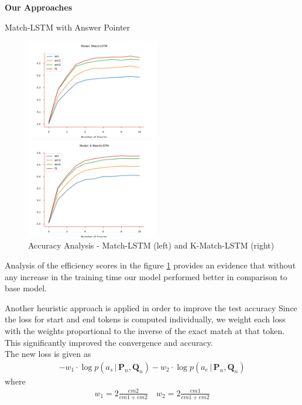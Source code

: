 \documentclass{article}
\def\*#1{\mathbf{#1}}
\begin{document}
\begin{psection}{\textbf{Our Approaches}}
\begin{psubsection}{Match-LSTM with Answer Pointer}
	\begin{figure}[ht!]
				\begin{minipage}{0.47\textwidth}
					\centering
					\includegraphics[trim={0 4mm 0 0},clip, width=220px]{includes/plots/match-lstm/accuracy-match-lstm.png}
					\caption*{(a) Match-LSTM}
				\end{minipage}
				\begin{minipage}{0.47\textwidth}

					\centering
					\includegraphics[trim={0 4mm 0 0},clip,width=220px]{includes/plots/match-lstm/accuracy-k-match-lstm.png}
					\caption*{(b) K-Match-LSTM}
				\end{minipage}
				\caption{Accuracy Analysis - Match-LSTM (left) and K-Match-LSTM (right)}
				\label{fig:k-match-comparison}
	\end{figure}
	   Analysis of the efficiency scores in the figure \ref{fig:k-match-comparison} provides an evidence that without any increase in the training time our model performed better in comparison to base model.


	   Another heuristic approach is applied in order to improve the test accuracy Since the loss for start and end tokens is computed individually, we weight each loss with the weights proportional to the inverse of the exact match at that token. This significantly improved the convergence and accuracy.\\
	   The new loss is given as
            \begin{align*}
                - w_1 \cdot \log p(a_s \,|\, \*P_n, \*Q_n) - w_2 \cdot \log p(a_e \,|\, \*P_n, \*Q_n)
            \end{align*}
            where
            \begin{align*}
                w_1 = 2 \frac{em2}{em1 + em2} \quad w_2 = 2 \frac{em1}{em1 + em2}
            \end{align*}


\end{psubsection}
\end{psection}
\end{document}
